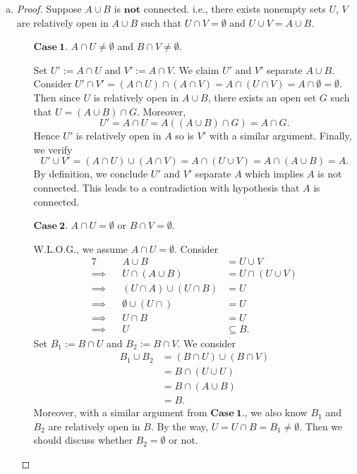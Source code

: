 \begin{Exercise}
\begin{enumerate}[a)]
\item
\begin{proof}
Suppose $A\cup B$ is $\mathbf{not}$ connected. i.e., there exists nonempty sets $U$, $V$ are relatively open in $A\cup B$ such that $U\cap V=\emptyset$ and $U\cup V=A\cup B$.
\begin{enumerate}
\item [$\mathbf{Case\ 1.}$] 
$A\cap U\neq \emptyset$ and $B\cap V\neq \emptyset$.

\vspace{1ex}

Set $U' := A\cap U$ and $V' := A\cap V$. We claim $U'$ and $V'$ separate $A\cup B$. \\
Consider $U'\cap V' = (A\cap U)\cap (A\cap V) = A\cap (U\cap V) = A\cap \emptyset = \emptyset.$
Then since $U$ is relatively open in $A\cup B$, there exists an open set $G$ such that $U = (A\cup B)\cap G$. Moreover, 
$$
U'
= A\cap U
= A\left( (A\cup B)\cap G \right)
= A\cap G.
$$
Hence $U'$ is relatively open in $A$ so is $V'$ with a similar argument.
Finally, we verify
$$
U'\cup V'
= (A\cap U)\cup(A\cap V)
= A\cap (U\cup V)
= A\cap (A\cup B)
= A.
$$
By definition, we conclude $U'$ and $V'$ separate $A$ which implies $A$ is not connected. This leads to a contradiction with hypothesis that $A$ is connected.

\item [$\mathbf{Case\ 2.}$]
$A\cap U = \emptyset$ or $B\cap V = \emptyset$.

\vspace{1ex}

W.L.O.G., we assume $A\cap U = \emptyset$. Consider
\begin{alignat*}{7}
\quad&& A\cup B &= U\cup V \\
\implies&& U\cap(A\cup B) &= U\cap(U\cup V) \\
\implies&& (U\cap A)\cup (U\cap B) &= U \\
\implies&& \emptyset\cup(U\cap) &= U \\
\implies&& U\cap B &= U \\
\implies&& U &\subseteq B.
\end{alignat*}
Set $B_1 := B\cap U$ and $B_2 := B\cap V$.
We consider
\begin{align*}
B_1\cup B_2
&= (B\cap U) \cup (B\cap V) \\
&= B\cap(U\cup U) \\
&= B\cap(A\cup B) \\
&= B.
\end{align*}
Moreover, with a similar argument from $\mathbf{Case\ 1.}$, we also know $B_1$ and $B_2$ are relatively open in $B$. By the way, $U = U\cap B = B_1 \neq \emptyset$. Then we should discuss whether $B_2 = \emptyset$ or not.


\end{enumerate}
\end{proof}
\end{enumerate}
\end{Exercise}
